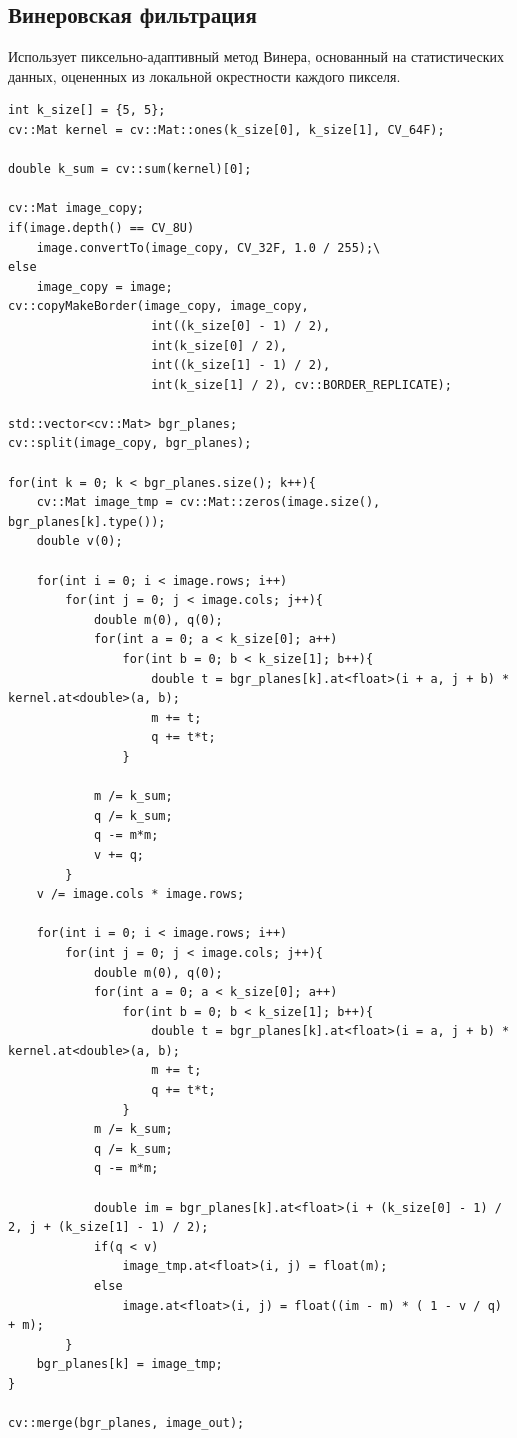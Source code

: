 \pagebreak

\subsection{Винеровская фильтрация}

Использует пиксельно-адаптивный метод Винера, основанный
на статистических данных, оцененных из локальной окрестности
каждого пикселя.

\begin{lstlisting}[style=cpp_white, caption={Исходный код Винеровского фильтра}]
int k_size[] = {5, 5};
cv::Mat kernel = cv::Mat::ones(k_size[0], k_size[1], CV_64F);

double k_sum = cv::sum(kernel)[0];

cv::Mat image_copy;
if(image.depth() == CV_8U)
    image.convertTo(image_copy, CV_32F, 1.0 / 255);\
else    
    image_copy = image;
cv::copyMakeBorder(image_copy, image_copy,
                    int((k_size[0] - 1) / 2),
                    int(k_size[0] / 2),
                    int((k_size[1] - 1) / 2),
                    int(k_size[1] / 2), cv::BORDER_REPLICATE);

std::vector<cv::Mat> bgr_planes;
cv::split(image_copy, bgr_planes);

for(int k = 0; k < bgr_planes.size(); k++){
    cv::Mat image_tmp = cv::Mat::zeros(image.size(), bgr_planes[k].type());
    double v(0);

    for(int i = 0; i < image.rows; i++)
        for(int j = 0; j < image.cols; j++){
            double m(0), q(0);
            for(int a = 0; a < k_size[0]; a++)
                for(int b = 0; b < k_size[1]; b++){
                    double t = bgr_planes[k].at<float>(i + a, j + b) * kernel.at<double>(a, b);
                    m += t;
                    q += t*t;
                }
            
            m /= k_sum;
            q /= k_sum;
            q -= m*m;
            v += q;
        }
    v /= image.cols * image.rows;

    for(int i = 0; i < image.rows; i++)
        for(int j = 0; j < image.cols; j++){
            double m(0), q(0);
            for(int a = 0; a < k_size[0]; a++)
                for(int b = 0; b < k_size[1]; b++){
                    double t = bgr_planes[k].at<float>(i = a, j + b) * kernel.at<double>(a, b);
                    m += t;
                    q += t*t;
                }
            m /= k_sum;
            q /= k_sum;
            q -= m*m;

            double im = bgr_planes[k].at<float>(i + (k_size[0] - 1) / 2, j + (k_size[1] - 1) / 2);
            if(q < v)
                image_tmp.at<float>(i, j) = float(m);
            else
                image.at<float>(i, j) = float((im - m) * ( 1 - v / q) + m);
        }
    bgr_planes[k] = image_tmp;
}

cv::merge(bgr_planes, image_out);
\end{lstlisting}


